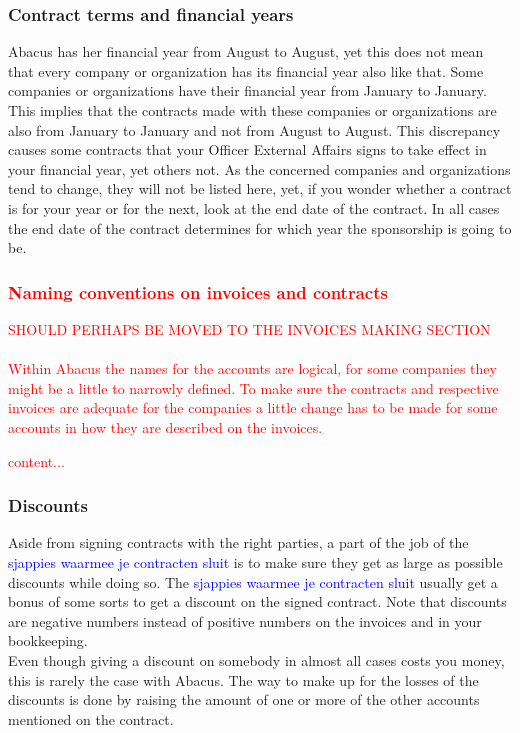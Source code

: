 \documentclass{report}
\begin{document}
\subsubsection{Contract terms and financial years}
Abacus has her financial year from August to August, yet this does not mean that every company or organization has its financial year also like that. Some companies or organizations have their financial year from January to January. This implies that the contracts made with these companies or organizations are also from January to January and not from August to August. This discrepancy causes some contracts that your Officer External Affairs signs to take effect in your financial year, yet others not. As the concerned companies and organizations tend to change, they will not be listed here, yet, if you wonder whether a contract is for your year or for the next, look at the end date of the contract. In all cases the end date of the contract determines for which year the sponsorship is going to be.   
\textcolor{red}{\subsubsection{Naming conventions on invoices and contracts}
	SHOULD PERHAPS BE MOVED TO THE INVOICES MAKING SECTION\\ \\
Within Abacus the names for the accounts are logical, for some companies they might be a little to narrowly defined. To make sure the contracts and respective invoices are adequate for the companies a little change has to be made for some accounts in how they are described on the invoices. 
\begin{table}
	\begin{tabular}
		content...
	\end{tabular}
\end{table}
}
\subsubsection{Discounts}
Aside from signing contracts with the right parties, a part of the job of the \textcolor{blue}{sjappies waarmee je contracten sluit} is to make sure they get as large as possible discounts while doing so. The \textcolor{blue}{sjappies waarmee je contracten sluit} usually get a bonus of some sorts to get a discount on the signed contract. Note that discounts are negative numbers instead of positive numbers on the invoices and in your bookkeeping.
\\
Even though giving a discount on somebody in almost all cases costs you money, this is rarely the case with Abacus. The way to make up for the losses of the discounts is done by raising the amount of one or more of the other accounts mentioned on the contract. 
\end{document}
